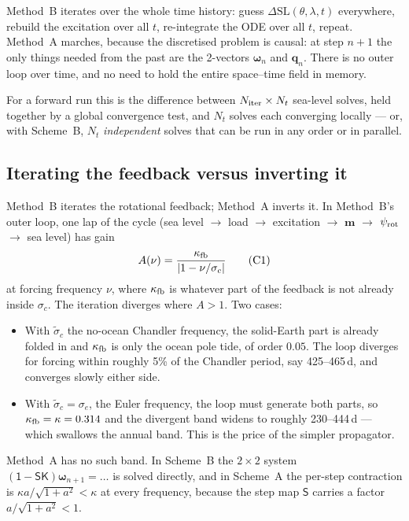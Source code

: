 \documentclass[11pt,a4paper]{article}
\newcommand{\bw}{\bm{\omega}}
\newcommand{\bq}{\mathbf{q}}
\newcommand{\Id}{\mathsf{1}}
\newcommand{\Sm}{\mathsf{S}}
\newcommand{\K}{\mathsf{K}}
\newcommand{\dSL}{\Delta\mathrm{SL}}
\begin{document}
Method~B iterates over the whole time history: guess $\dSL(\theta,\lambda,t)$ everywhere, rebuild
the excitation over all $t$, re-integrate the ODE over all $t$, repeat. Method~A marches, because
the discretised problem is causal: at step $n+1$ the only things needed from the past are the
2-vectors $\bw_n$ and $\bq_n$. There is no outer loop over time, and no need to hold the entire
space--time field in memory.

For a forward run this is the difference between $N_{\rm iter}\times N_t$ sea-level solves, held
together by a global convergence test, and $N_t$ solves each converging locally --- or, with
Scheme~B, $N_t$ \emph{independent} solves that can be run in any order or in parallel.

\subsection{Iterating the feedback versus inverting it}
\label{sec:gain}

Method~B iterates the rotational feedback; Method~A inverts it. In Method~B's outer loop, one lap of
the cycle (sea level $\to$ load $\to$ excitation $\to$ $\mathbf{m}$ $\to$ $\psi_{\rm rot}$ $\to$ sea
level) has gain
\begin{equation}
  A(\nu)=\frac{\kappa_{\rm fb}}{\left|1-\nu/\sigma_c\right|}
  \tag{C1}\label{c1}
\end{equation}
at forcing frequency $\nu$, where $\kappa_{\rm fb}$ is whatever part of the feedback is not already
inside $\sigma_c$. The iteration diverges where $A>1$. Two cases:
\begin{itemize}
  \item With $\tilde\sigma_c$ the no-ocean Chandler frequency, the solid-Earth part is already folded
  in and $\kappa_{\rm fb}$ is only the ocean pole tide, of order $0.05$. The loop diverges for forcing
  within roughly 5\% of the Chandler period, say 425--465\,d, and converges slowly either side.
  \item With $\tilde\sigma_c=\sigma_e$, the Euler frequency, the loop must generate both parts, so
  $\kappa_{\rm fb}=\kappa=0.314$ and the divergent band widens to roughly 230--444\,d --- which
  swallows the annual band. This is the price of the simpler propagator.
\end{itemize}
Method~A has no such band. In Scheme~B the $2\times2$ system $(\Id-\Sm\K)\bw_{n+1}=\dots$ is solved
directly, and in Scheme~A the per-step contraction is $\kappa a/\sqrt{1+a^2}<\kappa$ at every
frequency, because the step map $\Sm$ carries a factor $a/\sqrt{1+a^2}<1$.
\end{document}
